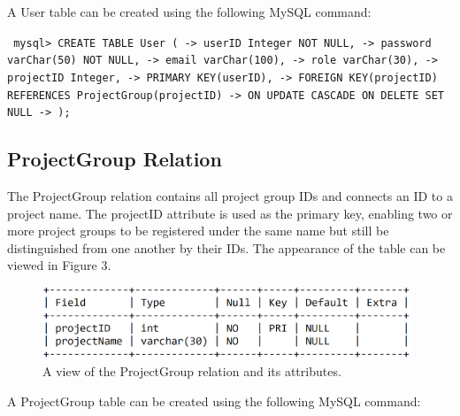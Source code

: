 \documentclass{article}
\begin{document}
A User table can be created using the following MySQL command:
\newline

\small
\texttt{
\noindent mysql> CREATE TABLE User (\newline
\indent\indent\indent -> userID Integer NOT NULL,\newline
\indent\indent\indent -> password varChar(50) NOT NULL,\newline
\indent\indent\indent -> email varChar(100),\newline
\indent\indent\indent -> role varChar(30),\newline
\indent\indent\indent -> projectID Integer,\newline
\indent\indent\indent -> PRIMARY KEY(userID),\newline
\indent\indent\indent -> FOREIGN KEY(projectID) REFERENCES ProjectGroup(projectID)\newline
\indent\indent\indent -> ON UPDATE CASCADE ON DELETE SET NULL\newline
\indent\indent\indent -> );\newline
}
\normalsize

\subsection{ProjectGroup Relation}
The ProjectGroup relation contains all project group IDs and connects an ID to a project name. The projectID attribute is used as the primary key, enabling two or more project groups to be registered under the same name but still be distinguished from one another by their IDs.  The appearance of the table can be viewed in Figure 3.

\begin{figure}[H]
     \centering
     \includegraphics[width=11cm]{images/SQL_tables/projectgroup.png}
     \renewcommand\figurename{Figure}
     \caption{A view of the ProjectGroup relation and its attributes.}
     \label{fig:my_label}
 \end{figure}
\newline

A ProjectGroup table can be created using the following MySQL command:
\newline
\end{document}
